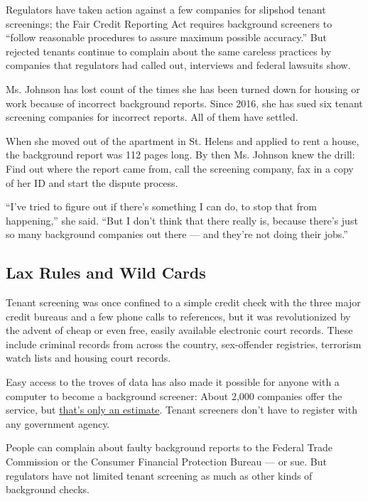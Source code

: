 Regulators have taken action against a few companies for slipshod tenant
screenings; the Fair Credit Reporting Act requires background screeners
to ``follow reasonable procedures to assure maximum possible accuracy.''
But rejected tenants continue to complain about the same careless
practices by companies that regulators had called out, interviews and
federal lawsuits show.

Ms. Johnson has lost count of the times she has been turned down for
housing or work because of incorrect background reports. Since 2016, she
has sued six tenant screening companies for incorrect reports. All of
them have settled.

When she moved out of the apartment in St. Helens and applied to rent a
house, the background report was 112 pages long. By then Ms. Johnson
knew the drill: Find out where the report came from, call the screening
company, fax in a copy of her ID and start the dispute process.

``I've tried to figure out if there's something I can do, to stop that
from happening,'' she said. ``But I don't think that there really is,
because there's just so many background companies out there --- and
they're not doing their jobs.''

\hypertarget{lax-rules-and-wild-cards}{%
\subsection{Lax Rules and Wild Cards}\label{lax-rules-and-wild-cards}}

Tenant screening was once confined to a simple credit check with the
three major credit bureaus and a few phone calls to references, but it
was revolutionized by the advent of cheap or even free, easily available
electronic court records. These include criminal records from across the
country, sex-offender registries, terrorism watch lists and housing
court records.

Easy access to the troves of data has also made it possible for anyone
with a computer to become a background screener: About 2,000 companies
offer the service, but
\href{https://files.consumerfinance.gov/f/documents/201909_cfpb_market-snapshot-background-screening_report.pdf}{that's
only an estimate}. Tenant screeners don't have to register with any
government agency.

People can complain about faulty background reports to the Federal Trade
Commission or the Consumer Financial Protection Bureau --- or sue. But
regulators have not limited tenant screening as much as other kinds of
background checks.

